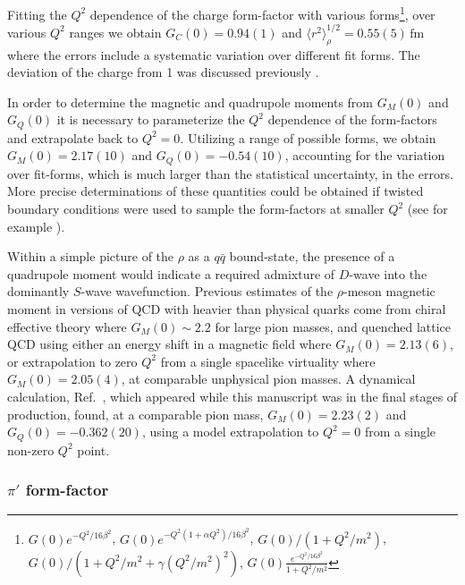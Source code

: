 Fitting the $Q^2$ dependence of the charge form-factor with various forms\footnote{$G(0) e^{-Q^2/16\beta^2}$, $G(0) e^{-Q^2(1+\alpha Q^2)/16\beta^2}$, $G(0)/(1+ Q^2/m^2)$, $G(0)/(1+ Q^2/m^2 + \gamma (Q^2/m^2)^2 )$, $G(0) \frac{e^{-Q^2/16\beta^2}  }{1+Q^2/m^2}$ }, over various $Q^2$ ranges we obtain $G_C(0) = 0.94(1)$ and ${  \langle r^2 \rangle_\rho^{1/2} = 0.55(5) \, \mathrm{fm} }$ where the errors include a systematic variation over different fit forms. The deviation of the charge from 1 was discussed previously . 

In order to determine the magnetic and quadrupole moments from $G_M(0)$ and $G_Q(0)$ it is necessary to parameterize the $Q^2$ dependence of the form-factors and extrapolate back to $Q^2=0$. Utilizing a range of possible forms, we obtain ${G_M(0) = 2.17(10)}$ and ${G_Q(0) = -0.54(10)}$, accounting for the variation over fit-forms, which is much larger than the statistical uncertainty, in the errors. More precise determinations of these quantities could be obtained if twisted boundary conditions were used to sample the form-factors at smaller $Q^2$ (see for example \cite{Flynn:2005in}).

Within a simple picture of the $\rho$ as a $q\bar{q}$ bound-state, the presence of a quadrupole moment would indicate a required admixture of $D$-wave into the dominantly $S$-wave wavefunction. Previous estimates of the $\rho$-meson magnetic moment in versions of QCD with heavier than physical quarks come from chiral effective theory \cite{Djukanovic:2013mka} where $G_M(0) \sim 2.2$ for large pion masses, and quenched lattice QCD using either an energy shift in a magnetic field \cite{Lee:2008qf} where $G_M(0) = 2.13(6)$, or extrapolation to zero $Q^2$ from a single spacelike virtuality \cite{Hedditch:2007ex} where $G_M(0) = 2.05(4)$, at comparable unphysical pion masses. A dynamical calculation, Ref.~\cite{Owen:2015gva}, which appeared while this manuscript was in the final stages of production, found, at a comparable pion mass, $G_M(0) = 2.23(2)$ and $G_Q(0) = -0.362(20)$, using a model extrapolation to $Q^2=0$ from a single non-zero $Q^2$ point.





\subsubsection{$\pi'$ form-factor}

